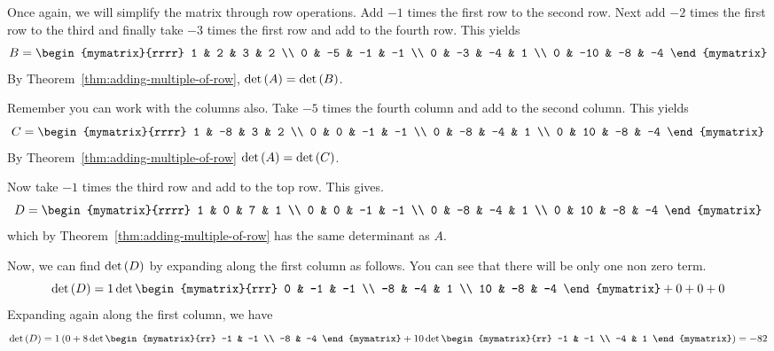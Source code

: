 \begin{solution} 
Once again, we will simplify the matrix through row operations. 
Add $-1$ times the first row to
the second row. Next add $-2$ times the first row to the third and finally take
$-3$ times the first row and add to the fourth row. This yields
\begin{equation*}
B = \begin{mymatrix}{rrrr}
1 & 2 & 3 & 2 \\
0 & -5 & -1 & -1 \\
0 & -3 & -4 & 1 \\
0 & -10 & -8 & -4
\end{mymatrix} 
\end{equation*}
By Theorem~\ref{thm:adding-multiple-of-row}, $\det \left(A\right) = \det \left(B\right)$. 

Remember you can work with the columns also. Take $-5$
times the fourth column and add to the second column. This yields
\begin{equation*}
C = \begin{mymatrix}{rrrr}
1 & -8 & 3 & 2 \\
0 & 0 & -1 & -1 \\
0 & -8 & -4 & 1 \\
0 & 10 & -8 & -4
\end{mymatrix}
\end{equation*}
By Theorem~\ref{thm:adding-multiple-of-row} $\det \left(A\right) = \det \left(C\right)$. 

Now take $-1$ times the third row and add to
the top row. This gives.
\begin{equation*}
D = \begin{mymatrix}{rrrr}
1 & 0 & 7 & 1 \\
0 & 0 & -1 & -1 \\
0 & -8 & -4 & 1 \\
0 & 10 & -8 & -4
\end{mymatrix}
\end{equation*}
which by Theorem~\ref{thm:adding-multiple-of-row} has the same determinant as $A$.

Now, we can find $\det \left(D\right)$ by expanding along the first column as follows. You can see that there will be only one non zero term.
\begin{equation*}
\det \tup{D} = 1 \det \begin{mymatrix}{rrr}
0 & -1 & -1 \\
-8 & -4 & 1 \\
10 & -8 & -4
\end{mymatrix}
+ 0 + 0 + 0 
\end{equation*}
Expanding again along the first column, we have
\begin{equation*}
\det \tup{D} 
=
1 \tup{0 +  8\det \begin{mymatrix}{rr}
-1 & -1 \\
-8 & -4
\end{mymatrix} +10\det \begin{mymatrix}{rr}
-1 & -1 \\
-4 & 1
\end{mymatrix} } = -82
\end{equation*}


\end{solution}
